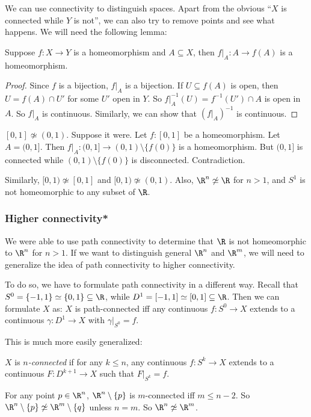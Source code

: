 \documentclass[a4paper]{article}
\begin{document}
We can use connectivity to distinguish spaces. Apart from the obvious ``$X$ is connected while $Y$ is not'', we can also try to remove points and see what happens. We will need the following lemma:
\begin{lemma}
  Suppose $f: X\to Y$ is a homeomorphism and $A\subseteq X$, then $f|_A: A\to f(A)$ is a homeomorphism.
\end{lemma}

\begin{proof}
  Since $f$ is a bijection, $f|_A$ is a bijection. If $U\subseteq f(A)$ is open, then $U = f(A) \cap U'$ for some $U'$ open in $Y$. So $f|_A^{-1}(U) = f^{-1}(U')\cap A$ is open in $A$. So $f|_A$ is continuous. Similarly, we can show that $(f|_A)^{-1}$ is continuous.
\end{proof}

\begin{eg} $[0, 1] \not\simeq (0, 1)$. Suppose it were. Let $f: [0, 1]$ be a homeomorphism. Let $A = (0, 1]$. Then $f|_A: (0, 1] \to (0, 1)\setminus\{f(0)\}$ is a homeomorphism. But $(0, 1]$ is connected while $(0, 1)\setminus \{f(0)\}$ is disconnected. Contradiction.

Similarly, $[0, 1)\not\simeq [0, 1]$ and $[0, 1)\not\simeq (0, 1)$. Also, $\R^n\not \simeq \R$ for $n > 1$, and $S^1$ is not homeomorphic to any subset of $\R$.
\end{eg}

\subsubsection{Higher connectivity*}
We were able to use path connectivity to determine that $\R$ is not homeomorphic to $\R^n$ for $n > 1$. If we want to distinguish general $\R^n$ and $\R^m$, we will need to generalize the idea of path connectivity to higher connectivity.

To do so, we have to formulate path connectivity in a different way. Recall that $S^0 = \{-1, 1\} \simeq \{0, 1\}\subseteq \R$, while $D^1 = [-1, 1] \simeq [0, 1] \subseteq \R$. Then we can formulate $X$ as: $X$ is path-connected iff any continuous $f: S^0\to X$ extends to a continuous $\gamma: D^1 \to X$ with $\gamma|_{S^0} = f$.

This is much more easily generalized:
\begin{defi}[$n$-connectedness]
  $X$ is $n$\emph{-connected} if for any $k \leq n$, any continuous $f: S^k \to X$ extends to a continuous $F: D^{k + 1}\to X$ such that $F|_{S^k} = f$.
\end{defi}
For any point $p\in \R^n$, $\R^n \setminus \{p\}$ is $m$-connected iff $m \leq n - 2$. So $\R^n\setminus\{p\} \not\simeq \R^m\setminus\{q\}$ unless $n = m$. So $\R^n \not\simeq \R^m$.
\end{document}
